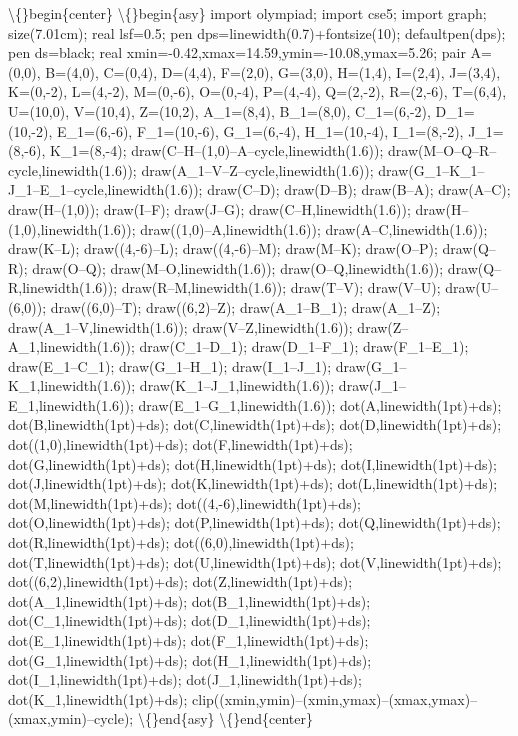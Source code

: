 \documentclass{article}
\begin{document}
\begin{enumerate}[label=\arabic*., itemsep=0.5em]
\textbackslash\{\}begin\{center\}
\textbackslash\{\}begin\{asy\}
import olympiad;
import cse5;
import graph; size(7.01cm); real lsf=0.5; pen dps=linewidth(0.7)+fontsize(10); defaultpen(dps); pen ds=black; real xmin=-0.42,xmax=14.59,ymin=-10.08,ymax=5.26; 
pair A=(0,0), B=(4,0), C=(0,4), D=(4,4), F=(2,0), G=(3,0), H=(1,4), I=(2,4), J=(3,4), K=(0,-2), L=(4,-2), M=(0,-6), O=(0,-4), P=(4,-4), Q=(2,-2), R=(2,-6), T=(6,4), U=(10,0), V=(10,4), Z=(10,2), A\_1=(8,4), B\_1=(8,0), C\_1=(6,-2), D\_1=(10,-2), E\_1=(6,-6), F\_1=(10,-6), G\_1=(6,-4), H\_1=(10,-4), I\_1=(8,-2), J\_1=(8,-6), K\_1=(8,-4); 
draw(C--H--(1,0)--A--cycle,linewidth(1.6)); draw(M--O--Q--R--cycle,linewidth(1.6)); draw(A\_1--V--Z--cycle,linewidth(1.6)); draw(G\_1--K\_1--J\_1--E\_1--cycle,linewidth(1.6)); 
draw(C--D); draw(D--B); draw(B--A); draw(A--C); draw(H--(1,0)); draw(I--F); draw(J--G); draw(C--H,linewidth(1.6)); draw(H--(1,0),linewidth(1.6)); draw((1,0)--A,linewidth(1.6)); draw(A--C,linewidth(1.6)); draw(K--L); draw((4,-6)--L); draw((4,-6)--M); draw(M--K); draw(O--P); draw(Q--R); draw(O--Q); draw(M--O,linewidth(1.6)); draw(O--Q,linewidth(1.6)); draw(Q--R,linewidth(1.6)); draw(R--M,linewidth(1.6)); draw(T--V); draw(V--U); draw(U--(6,0)); draw((6,0)--T); draw((6,2)--Z); draw(A\_1--B\_1); draw(A\_1--Z); draw(A\_1--V,linewidth(1.6)); draw(V--Z,linewidth(1.6)); draw(Z--A\_1,linewidth(1.6)); draw(C\_1--D\_1); draw(D\_1--F\_1); draw(F\_1--E\_1); draw(E\_1--C\_1); draw(G\_1--H\_1); draw(I\_1--J\_1); draw(G\_1--K\_1,linewidth(1.6)); draw(K\_1--J\_1,linewidth(1.6)); draw(J\_1--E\_1,linewidth(1.6)); draw(E\_1--G\_1,linewidth(1.6)); 
dot(A,linewidth(1pt)+ds); dot(B,linewidth(1pt)+ds); dot(C,linewidth(1pt)+ds); dot(D,linewidth(1pt)+ds); dot((1,0),linewidth(1pt)+ds); dot(F,linewidth(1pt)+ds); dot(G,linewidth(1pt)+ds); dot(H,linewidth(1pt)+ds); dot(I,linewidth(1pt)+ds); dot(J,linewidth(1pt)+ds); dot(K,linewidth(1pt)+ds); dot(L,linewidth(1pt)+ds); dot(M,linewidth(1pt)+ds); dot((4,-6),linewidth(1pt)+ds); dot(O,linewidth(1pt)+ds); dot(P,linewidth(1pt)+ds); dot(Q,linewidth(1pt)+ds); dot(R,linewidth(1pt)+ds); dot((6,0),linewidth(1pt)+ds); dot(T,linewidth(1pt)+ds); dot(U,linewidth(1pt)+ds); dot(V,linewidth(1pt)+ds); dot((6,2),linewidth(1pt)+ds); dot(Z,linewidth(1pt)+ds); dot(A\_1,linewidth(1pt)+ds); dot(B\_1,linewidth(1pt)+ds); dot(C\_1,linewidth(1pt)+ds); dot(D\_1,linewidth(1pt)+ds); dot(E\_1,linewidth(1pt)+ds); dot(F\_1,linewidth(1pt)+ds); dot(G\_1,linewidth(1pt)+ds); dot(H\_1,linewidth(1pt)+ds); dot(I\_1,linewidth(1pt)+ds); dot(J\_1,linewidth(1pt)+ds); dot(K\_1,linewidth(1pt)+ds); 
clip((xmin,ymin)--(xmin,ymax)--(xmax,ymax)--(xmax,ymin)--cycle);
\textbackslash\{\}end\{asy\}
\textbackslash\{\}end\{center\}



\end{enumerate}
\end{document}
